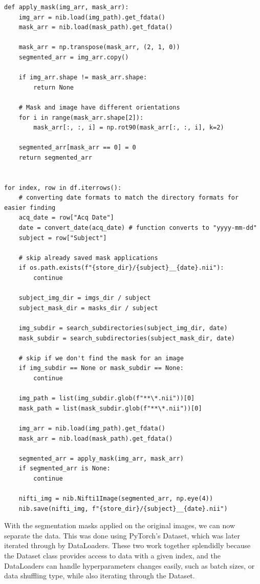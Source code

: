 \documentclass[a4paper, 12pt]{article}
\begin{document}
\begin{lstlisting}
def apply_mask(img_arr, mask_arr):
    img_arr = nib.load(img_path).get_fdata()
    mask_arr = nib.load(mask_path).get_fdata()

    mask_arr = np.transpose(mask_arr, (2, 1, 0))
    segmented_arr = img_arr.copy()

    if img_arr.shape != mask_arr.shape:
        return None

    # Mask and image have different orientations
    for i in range(mask_arr.shape[2]): 
        mask_arr[:, :, i] = np.rot90(mask_arr[:, :, i], k=2)

    segmented_arr[mask_arr == 0] = 0
    return segmented_arr


for index, row in df.iterrows():
    # converting date formats to match the directory formats for easier finding
    acq_date = row["Acq Date"]
    date = convert_date(acq_date) # function converts to "yyyy-mm-dd"
    subject = row["Subject"]
    
    # skip already saved mask applications
    if os.path.exists(f"{store_dir}/{subject}__{date}.nii"):
        continue

    subject_img_dir = imgs_dir / subject
    subject_mask_dir = masks_dir / subject

    img_subdir = search_subdirectories(subject_img_dir, date)
    mask_subdir = search_subdirectories(subject_mask_dir, date)

    # skip if we don't find the mask for an image
    if img_subdir == None or mask_subdir == None:
        continue

    img_path = list(img_subdir.glob(f"**\*.nii"))[0] 
    mask_path = list(mask_subdir.glob(f"**\*.nii"))[0] 
    
    img_arr = nib.load(img_path).get_fdata()
    mask_arr = nib.load(mask_path).get_fdata()

    segmented_arr = apply_mask(img_arr, mask_arr)
    if segmented_arr is None:
        continue
    
    nifti_img = nib.Nifti1Image(segmented_arr, np.eye(4))
    nib.save(nifti_img, f"{store_dir}/{subject}__{date}.nii")
\end{lstlisting}

With the segmentation masks applied on the original images, we can now separate the data. This was done using
PyTorch's Dataset, which was later iterated through by DataLoaders. These two work together splendidly because
the Dataset class provides access to data with a given index, and the DataLoaders can handle hyperparameters
changes easily, such as batch sizes, or data shuffling type, while also iterating through the Dataset.
\end{document}
